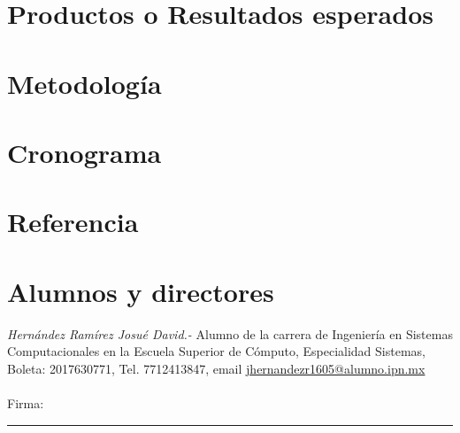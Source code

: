 \documentclass[letterpaper, 10pt]{article}
\begin{document}
\section{Productos o Resultados esperados}

\section{Metodología}

\section{Cronograma}

\section{Referencia}

\section{Alumnos y directores}

\begin{multicols*}{2}
    \textit{Hernández Ramírez Josué David.- }Alumno de la carrera de Ingeniería en Sistemas Computacionales en la Escuela Superior de Cómputo, Especialidad Sistemas, Boleta: 2017630771, Tel. 7712413847, email \url{jhernandezr1605@alumno.ipn.mx} \\ \\
    
    Firma: \rule{7cm}{1pt}
\end{multicols*}
\end{document}
